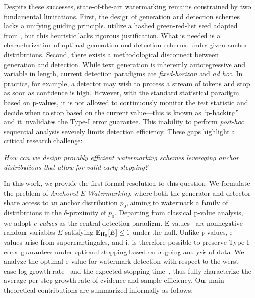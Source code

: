 Despite these successes, state-of-the-art watermarking remains constrained by two fundamental limitations. First, the design of generation and detection schemes lacks a unifying guiding principle.  \citet{huang2025watermarking} utilize a hashed green-red-list seed adapted from \citet{kirchenbauer2023watermark}, but this heuristic lacks rigorous justification. What is needed is a characterization of optimal generation and detection schemes under given anchor distributions.
Second, there exists a methodological disconnect between generation and detection. While text generation is inherently autoregressive and variable in length, current detection paradigms are \emph{fixed-horizon} and \emph{ad hoc}. In practice, for example, a detector may wish to process a stream of tokens and stop as soon as confidence is high. However, with the standard statistical paradigm based on p-values, it is not allowed to continuously monitor the test statistic and decide when to stop based on the current value---this is known as ``p-hacking'' and it invalidates the Type-I error guarantee. This inability to perform \emph{post-hoc} sequential analysis severely limits detection efficiency. These gaps highlight a critical research challenge:
\begin{center}
    \emph{How can we design provably efficient watermarking schemes leveraging anchor distributions that allow for valid early stopping?}
\end{center}

In this work, we provide the first formal resolution to this question. We formulate the problem of \emph{Anchored E-Watermarking}, where both the generator and detector share access to an anchor distribution $p_0$, aiming to watermark a family of distributions in the $\delta$-proximity of $p_0$. Departing from classical p-value analysis, we adopt \emph{e-values} as the central detection paradigm. E-values~\citep{vovk1993logic,shafer2011testmartingales,vovk2021values} are nonnegative random variables $E$ satisfying $\mathbb{E}_{\mathbf{H}_0}[E] \leq 1$ under the null. Unlike p-values, e-values arise from supermartingales, and it is therefore possible to preserve Type-I error guarantees under optional stopping based on ongoing analysis of data. We analyze the optimal e-value for watermark detection with respect to the worst-case log-growth rate~\citep{kelly1956new} and the expected stopping time~\citep{grunwald2020safe,waudby2025universal}, thus fully characterize the average per-step growth rate of evidence and sample efficiency. Our main theoretical contributions are summarized informally as follows:

